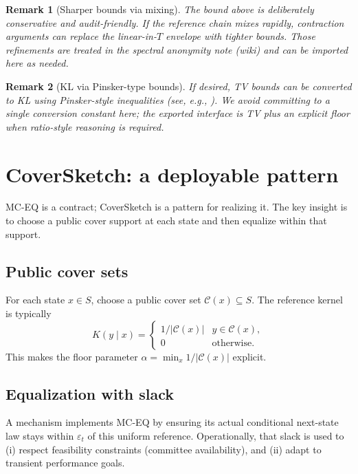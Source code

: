 \documentclass[11pt]{article}
\newtheorem{remark}{Remark}
\newcommand{\eps}{\varepsilon}
\begin{document}
\begin{remark}[Sharper bounds via mixing]
The bound above is deliberately conservative and audit-friendly.
If the reference chain mixes rapidly, contraction arguments can replace the linear-in-$T$ envelope with tighter bounds.
Those refinements are treated in the spectral anonymity note (wiki) and can be imported here as needed.
\end{remark}

\begin{remark}[KL via Pinsker-type bounds]
If desired, TV bounds can be converted to KL using Pinsker-style inequalities (see, e.g., \cite{canonne_kl_tv}).
We avoid committing to a single conversion constant here; the exported interface is TV plus an explicit floor when ratio-style reasoning is required.
\end{remark}

\section{CoverSketch: a deployable pattern}
MC-EQ is a contract; CoverSketch is a pattern for realizing it.
The key insight is to choose a public cover support at each state and then equalize within that support.

\subsection{Public cover sets}
For each state $x\in S$, choose a public cover set $\mathcal{C}(x)\subseteq S$.
The reference kernel is typically
\[
K(y\mid x) = \begin{cases}1/|\mathcal{C}(x)| & y\in \mathcal{C}(x),\\ 0 & \text{otherwise.}\end{cases}
\]
This makes the floor parameter $\alpha = \min_x 1/|\mathcal{C}(x)|$ explicit.

\subsection{Equalization with slack}
A mechanism implements MC-EQ by ensuring its actual conditional next-state law stays within $\eps_t$ of this uniform reference.
Operationally, that slack is used to (i) respect feasibility constraints (committee availability), and (ii) adapt to transient performance goals.
\end{document}

